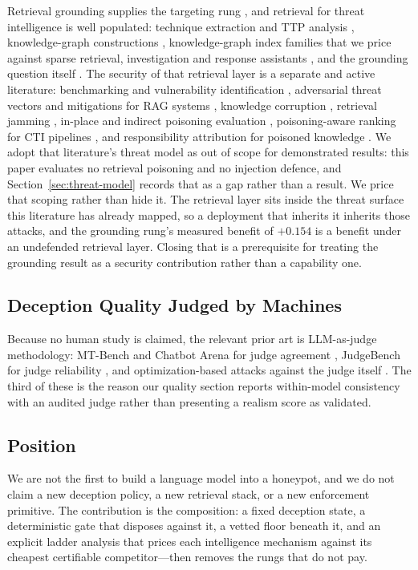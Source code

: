Retrieval grounding supplies the targeting rung
\cite{lewis2020}, and retrieval for threat intelligence is well populated:
technique extraction and TTP analysis \cite{fayyazi2023,lekssays2025},
knowledge-graph constructions \cite{gao2025,jeon2024,belmahjoub2025},
knowledge-graph index families \cite{malkov2018} that we price against
sparse retrieval, investigation and response assistants
\cite{rajapaksha2024,paul2025,qiao2025,liu2025}, and the \attck{}
grounding question itself \cite{roy2023,alsada2024,noureddine2020}. The
security of that retrieval layer is a separate and active literature:
benchmarking and vulnerability identification \cite{xue2024,liang2025},
adversarial threat vectors and mitigations for RAG systems
\cite{ward2025}, knowledge corruption \cite{zou2025poisonedrag,chaudhari2024},
retrieval jamming \cite{shafran2024}, in-place and indirect poisoning
evaluation \cite{malladi2026ripeii}, poisoning-aware ranking for CTI
pipelines \cite{jia2025}, and responsibility attribution for poisoned
knowledge \cite{zhang2026ragorigin}. We adopt that literature's threat
model as out of scope for demonstrated results: this paper evaluates no
retrieval poisoning and no injection defence, and
Section~\ref{sec:threat-model} records that as a gap rather than a
result. We price that scoping rather than hide it. The retrieval layer sits
inside the threat surface this literature has already mapped, so a deployment
that inherits it inherits those attacks, and the grounding rung's measured
benefit of $+0.154$ is a benefit under an undefended retrieval layer. Closing
that is a prerequisite for treating the grounding result as a security
contribution rather than a capability one.

\subsection{Deception Quality Judged by Machines}

Because no human study is claimed, the relevant prior art is LLM-as-judge
methodology: MT-Bench and Chatbot Arena for judge agreement
\cite{zheng2024}, JudgeBench for judge reliability \cite{tan2025judgebench},
and optimization-based attacks against the judge itself
\cite{shi2024judgedeceiver}. The third of these is the reason our quality
section reports within-model consistency with an audited judge rather than
presenting a realism score as validated.

\subsection{Position}

We are not the first to build a language model into a honeypot, and we do
not claim a new deception policy, a new retrieval stack, or a new
enforcement primitive. The contribution is the composition: a fixed
deception state, a deterministic gate that disposes against it, a vetted
floor beneath it, and an explicit ladder analysis that prices each
intelligence mechanism against its cheapest certifiable competitor---then
removes the rungs that do not pay.